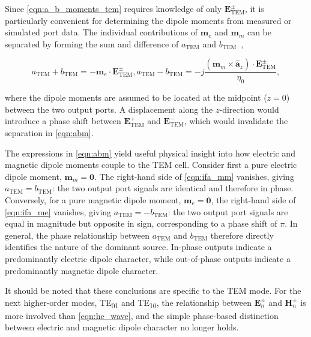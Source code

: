 Since \eqref{eqn:a_b_moments_tem} requires knowledge of only $\mathbf{E}^\pm_\mathrm{TEM}$, 
it is particularly convenient for determining the dipole moments from measured or 
simulated port data. The individual contributions of $\mathbf{m}_e$ and $\mathbf{m}_m$ 
can be separated by forming the sum and difference of $a_\mathrm{TEM}$ and 
$b_\mathrm{TEM}$~\cite{Sreenivasiah_Chang_Ma_1981},

\begin{subequations}\label{eqn:abm}
	\begin{equation}
		a_\mathrm{TEM} + b_\mathrm{TEM} = 
		-\mathbf{m}_{e}\cdot\mathbf{E}_\mathrm{TEM}^\pm,
		\label{eqn:ifa_me}
	\end{equation}
	\begin{equation}
		a_\mathrm{TEM} - b_\mathrm{TEM} = 
		-j\frac{\left(\mathbf{m}_{m}\times\hat{\mathbf{a}}_z\right)
			\cdot\mathbf{E}_\mathrm{TEM}^\pm}{\eta_0},
		\label{eqn:ifa_mm}
	\end{equation}
\end{subequations}

where the dipole moments are assumed to be located at the midpoint ($z=0$) between the two 
output ports. A displacement 
along the $z$-direction would introduce a phase shift between 
$\mathbf{E}^+_\mathrm{TEM}$ and $\mathbf{E}^-_\mathrm{TEM}$, which would invalidate 
the separation in \eqref{eqn:abm}.

The expressions in \eqref{eqn:abm} yield useful physical insight into how electric and magnetic dipole moments couple to the TEM cell. Consider first a pure electric dipole moment, $\mathbf{m}_m = \mathbf{0}$. The right-hand side of \eqref{eqn:ifa_mm} vanishes, giving $a_\mathrm{TEM} = b_\mathrm{TEM}$: the two output port signals are identical and therefore in phase. Conversely, for a pure magnetic dipole moment, $\mathbf{m}_e = \mathbf{0}$, the right-hand side of \eqref{eqn:ifa_me} vanishes, giving $a_\mathrm{TEM} = -b_\mathrm{TEM}$: the two output port signals are equal in magnitude but opposite in sign, corresponding to a phase shift of $\pi$. In general, the phase relationship between $a_\mathrm{TEM}$ and $b_\mathrm{TEM}$ therefore directly identifies the nature of the dominant source. In-phase outputs indicate a predominantly electric dipole character, while out-of-phase outputs indicate a predominantly magnetic dipole character.

It should be noted that these conclusions are specific to the TEM mode. For the 
next higher-order modes, TE\textsubscript{01} and TE\textsubscript{10}, the 
relationship between $\mathbf{E}_n^\pm$ and $\mathbf{H}_n^\pm$ is more involved 
than \eqref{eqn:he_wave}, and the simple phase-based distinction between electric 
and magnetic dipole character no longer holds.

